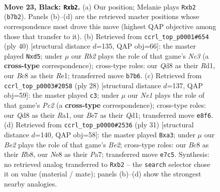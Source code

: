 \documentclass[11pt]{article}
\begin{document}
\clearpage

\begin{figure}[p]\centering
\begin{subfigure}{0.46\textwidth}\centering
\resizebox{\linewidth}{!}{%
\newchessgame
\chessboard[
  setfen={2bqnkr1/1r2bp2/p5p1/n1BBp2p/P3P3/3PQ2N/1PP2PPP/RN2R1K1 b - - 0 23},
  showmover=false,
  pgfstyle=straightmove, color=movearrow, markmove={b7-b2}
]}
\caption{}
\end{subfigure}\hfill
\begin{subfigure}{0.46\textwidth}\centering
\resizebox{\linewidth}{!}{%
\newchessgame
\chessboard[
  setfen={r2q1rk1/4ppbp/n1p1b1p1/pp1nP3/7P/2N1B1P1/PPQ2PBN/3RR1K1 w - - 4 21},
  showmover=false,
  pgfstyle=straightmove, color=movearrow, markmove={c3-d5}
]}
\caption{}
\end{subfigure}
\\[4pt]
\begin{subfigure}{0.46\textwidth}\centering
\resizebox{\linewidth}{!}{%
\newchessgame
\chessboard[
  setfen={r3k2r/pppq1p2/2np4/6Bp/3bb1pP/8/PPP1BNP1/R2Q1RK1 w kq - 2 15},
  showmover=false,
  pgfstyle=straightmove, color=movearrow, markmove={c2-c3}
]}
\caption{}
\end{subfigure}\hfill
\begin{subfigure}{0.46\textwidth}\centering
\resizebox{\linewidth}{!}{%
\newchessgame
\chessboard[
  setfen={1r1q1rk1/p3bp1p/2p3p1/3np3/8/BPN2Q1N/P1PP1PPP/R3K2R b KQ - 0 16},
  showmover=false,
  pgfstyle=straightmove, color=movearrow, markmove={e7-a3}
]}
\caption{}
\end{subfigure}
\caption{\textbf{Move 23, Black: \texttt{Rxb2}.} (a) Our position; Melanie plays \texttt{Rxb2} (\texttt{b7b2}). Panels (b)--(d) are the retrieved master positions whose correspondence most drove this move (highest QAP objective among those that transfer to it). (b) Retrieved from \texttt{ccrl\_top\_p0001\#654} (ply 40) [structural distance $d$=135, QAP obj=66]: the master played \texttt{Nxd5}; under $\mu$ our \emph{Rb2} plays the role of that game's \emph{Nc3} (a \textbf{cross-type} correspondence); cross-type roles: our \emph{Q}d8 as their \emph{R}d1, our \emph{B}c8 as their \emph{R}e1; transferred move \texttt{b7b6}. (c) Retrieved from \texttt{ccrl\_top\_p0003\#2058} (ply 28) [structural distance $d$=137, QAP obj=59]: the master played \texttt{c3}; under $\mu$ our \emph{Ne1} plays the role of that game's \emph{Pc2} (a \textbf{cross-type} correspondence); cross-type roles: our \emph{Q}d8 as their \emph{R}a1, our \emph{B}e7 as their \emph{Q}d1; transferred move \texttt{e8f6}. (d) Retrieved from \texttt{ccrl\_top\_p0000\#2536} (ply 31) [structural distance $d$=140, QAP obj=58]: the master played \texttt{Bxa3}; under $\mu$ our \emph{Be2} plays the role of that game's \emph{Be2}; cross-type roles: our \emph{B}c8 as their \emph{R}b8, our \emph{N}e8 as their \emph{P}a7; transferred move \texttt{e7c5}. Synthesis: no retrieved analog transferred to \texttt{Rxb2} -- the \texttt{search} selector chose it on value (material / mate); panels (b)--(d) show the strongest nearby analogies.}
\label{fig:thought-m45}
\end{figure}
\end{document}
